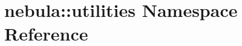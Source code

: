 \hypertarget{namespacenebula_1_1utilities}{
\section{nebula::utilities Namespace Reference}
\label{namespacenebula_1_1utilities}
}
